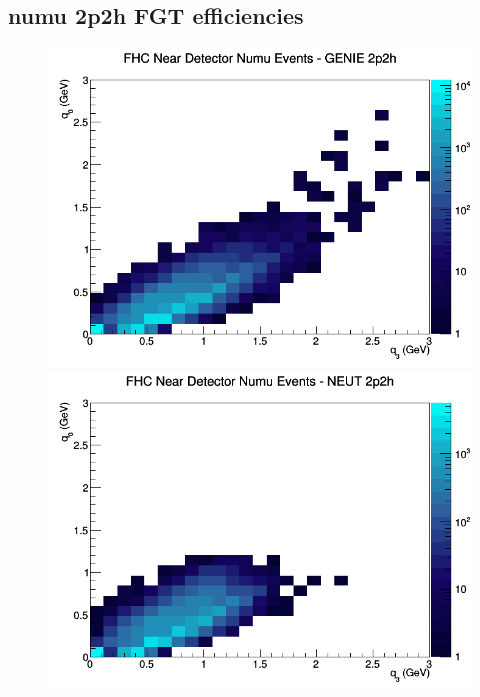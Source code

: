 \documentclass[12pt]{article}
\begin{document}
\subsection{numu 2p2h FGT efficiencies}
\begin{figure}[h]
\includegraphics[width=\linewidth]{eff_q0_q3/FGT/2p2h_FHC_ND_numu_q3_q0_GENIE.png}
\endminipage
{}
\includegraphics[width=\linewidth]{eff_q0_q3/FGT/2p2h_FHC_ND_numu_q3_q0_NEUT.png}
\endminipage
{}

\end{figure}
\end{document}
